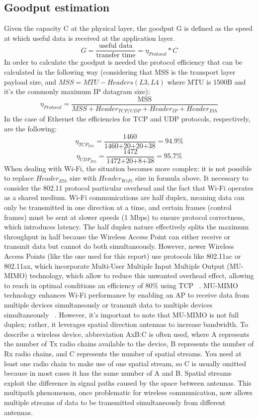 \subsection{Goodput estimation}
Given the capacity C at the physical layer, the goodput G is defined as the speed at which useful data is received at the application layer. \[ G = \frac{\text{useful data}}{\text{transfer time}} = \eta_{Protocol} * C \]
In order to calculate the goodput is needed the protocol efficiency that can be calculated in the following way (considering that MSS is the transport layer payload size, and $MSS = MTU - Headers (L3, L4) $ where MTU is 1500B and it's the commonly maximum IP datagram size): 
\[ \eta_{Protocol} = \frac{\text{MSS}}{MSS+Header_{TCP/UDP}+Header_{IP}+Header_{Eth}} \]
In the case of Ethernet the efficiencies for TCP and UDP protocols, respectively, are the following:
\[ \eta_{TCP_{Eth}} =\frac{\text{1460}}{\text{1460+20+20+38}} = 94.9\%  \]
\[ \eta_{UDP_{Eth}} = \frac{\text{1472}}{\text{1472+20+8+38}} = 95.7\%  \]
When dealing with Wi-Fi, the situation becomes more complex: it is not possible to replace ${Header_{Eth}}$ size with ${Header_{WiFi}}$ size in formula above. It necessary to consider the 802.11 protocol particular overhead and the fact that Wi-Fi operates as a shared medium. Wi-Fi communications are half duplex, meaning data can only be transmitted in one direction at a time, and certain frames (control frames) must be sent at slower speeds (1 Mbps) to ensure protocol correctness, which introduces latency. The half duplex nature effectively splits the maximum throughput in half because the Wireless Access Point can either receive or transmit data but cannot do both simultaneously.
However, newer Wireless Access Points (like the one used for this report) use protocols like 802.11ac or 802.11ax, which incorporate Multi-User Multiple Input Multiple Output (MU-MIMO) technology, which allow to reduce this unwanted overhead effect, allowing to reach in optimal conditions an efficiency of 80\% using TCP ~\cite{wiisfi}.
MU-MIMO technology enhances Wi-Fi performance by enabling an AP to receive data from multiple devices simultaneously or transmit data to multiple devices simultaneously ~\cite{mu_mimo_cisco, mu_mimo_huawei}. However, it's important to note that MU-MIMO is not full duplex; rather, it leverages spatial direction antennas to increase bandwidth. To describe a wireless device, abbreviation AxB:C is often used, where A represents the number of Tx radio chains available to the device, B represents the number of Rx radio chains, and C represents the number of spatial streams. You need at least one radio chain to make use of one spatial stream, so C is usually omitted because in most cases it has the same number of A and B. Spatial streams exploit the difference in signal paths caused by the space between antennas. This multipath phenomenon, once problematic for wireless communication, now allows multiple streams of data to be transmitted simultaneously from different antennas. 
